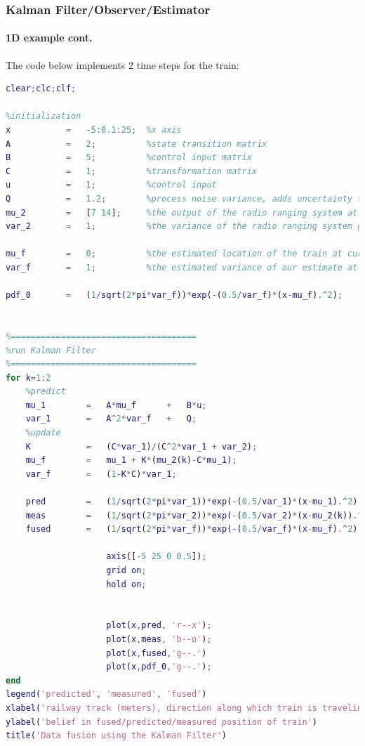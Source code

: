 \begin{frame}[fragile]
\frametitle{Kalman Filter/Observer/Estimator}
\framesubtitle{1D example \tiny cont.}

\scriptsize
The code below implements 2 time steps for the train:
\tinyvvv \begin{lstlisting}[language=Matlab]
clear;clc;clf;

%initialization
x           =   -5:0.1:25;  %x axis
A           =   2;          %state transition matrix
B           =   5;          %control input matrix
C           =   1;          %transformation matrix
u           =   1;          %control input
Q           =   1.2;        %process noise variance, adds uncertainty to prediction
mu_2        =   [7 14];     %the output of the radio ranging system at next two times
var_2       =   1;          %the variance of the radio ranging system given by manufacturer

mu_f        =   0;          %the estimated location of the train at current time, k=0
var_f       =   1;          %the estimated variance of our estimate at current time, k=0

pdf_0       =   (1/sqrt(2*pi*var_f))*exp(-(0.5/var_f)*(x-mu_f).^2);


%=====================================
%run Kalman Filter
%=====================================
for k=1:2
    %predict
    mu_1        =   A*mu_f      +   B*u;
    var_1       =   A^2*var_f   +   Q;
    %update
    K           =   (C*var_1)/(C^2*var_1 + var_2);
    mu_f        =   mu_1 + K*(mu_2(k)-C*mu_1);
    var_f       =   (1-K*C)*var_1;
    
    pred        =   (1/sqrt(2*pi*var_1))*exp(-(0.5/var_1)*(x-mu_1).^2);
    meas        =   (1/sqrt(2*pi*var_2))*exp(-(0.5/var_2)*(x-mu_2(k)).^2);
    fused       =   (1/sqrt(2*pi*var_f))*exp(-(0.5/var_f)*(x-mu_f).^2);
    
                    axis([-5 25 0 0.5]); 
                    grid on;
                    hold on;


                    plot(x,pred, 'r--x');
                    plot(x,meas, 'b--o');
                    plot(x,fused,'g--.')
                    plot(x,pdf_0,'g--.');                    
end
legend('predicted', 'measured', 'fused')
xlabel('railway track (meters), direction along which train is traveling ->')
ylabel('belief in fused/predicted/measured position of train')
title('Data fusion using the Kalman Filter')
\end{lstlisting}
\end{frame}








